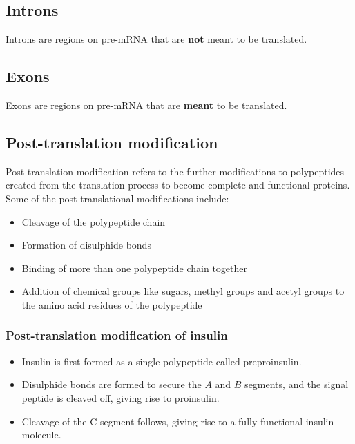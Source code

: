\documentclass[11pt]{article}
\begin{document}
\subsection{Introns}
\label{sec:org2099869}
Introns are regions on pre-mRNA that are \textbf{not} meant to be translated.

\subsection{Exons}
\label{sec:org2c3ca6e}
Exons are regions on pre-mRNA that are \textbf{meant} to be translated.

\subsection{Post-translation modification}
\label{sec:org7e2c93b}
Post-translation modification refers to the further modifications to polypeptides created from the translation process to become complete and functional proteins.
\\[0pt]

Some of the post-translational modifications include:
\begin{itemize}
\item Cleavage of the polypeptide chain
\item Formation of disulphide bonds
\item Binding of more than one polypeptide chain together
\item Addition of chemical groups like sugars, methyl groups and acetyl groups to the amino acid residues of the polypeptide
\end{itemize}


\subsubsection{Post-translation modification of insulin}
\label{sec:org95d2351}
\begin{itemize}
\item Insulin is first formed as a single polypeptide called preproinsulin.
\item Disulphide bonds are formed to secure the \(A\) and \(B\) segments, and the signal peptide is cleaved off, giving rise to proinsulin.
\item Cleavage of the C segment follows, giving rise to a fully functional insulin molecule.
\end{itemize}
\end{document}
